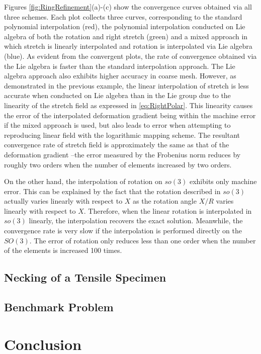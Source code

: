 \documentclass[12pt]{article}
\begin{document}
Figures \ref{fig:RingRefinement}(a)-(c) show the convergence curves
obtained via all three schemes.  Each plot collects three curves,
corresponding to the standard polynomial interpolation (red), the
polynomial interpolation conducted on Lie algebra of both the rotation
and right stretch (green) and a mixed approach in which stretch is
linearly interpolated and rotation is interpolated via Lie algebra
(blue).  As evident from the convergent plots, the rate of convergence
obtained via the Lie algebra is faster than the standard interpolation
approach. The Lie algebra approach also exhibits higher accuracy in
coarse mesh. However, as demonstrated in the previous example, the
linear interpolation of stretch is less accurate when conducted on Lie
algebra than in the Lie group due to the linearity of the stretch
field as expressed in \eqref{eq:RightPolar}. This linearity causes the
error of the interpolated deformation gradient being within the
machine error if the mixed approach is used, but also leads to error
when attempting to reproducing linear field with the logarithmic
mapping scheme. The resultant convergence rate of stretch field is
approximately the same as that of the deformation gradient --the error
measured by the Frobenius norm reduces by roughly two orders when the
number of elements increased by two orders.

On the other hand, the interpolation of rotation on $so(3)$ exhibits
only machine error. This can be explained by the fact that the
rotation described in $so(3)$ actually varies linearly with respect to
$X$ as the rotation angle $X/R$ varies linearly with respect to
$X$. Therefore, when the linear rotation is interpolated in $so(3)$
linearly, the interpolation recovers the exact solution. Meanwhile,
the convergence rate is very slow if the interpolation is performed
directly on the $SO(3)$. The error of rotation only reduces less than
one order when the number of the elements is increased 100 times.

\subsection{Necking of a Tensile Specimen}

\subsection{Benchmark Problem}

\section{Conclusion}



\end{document}
